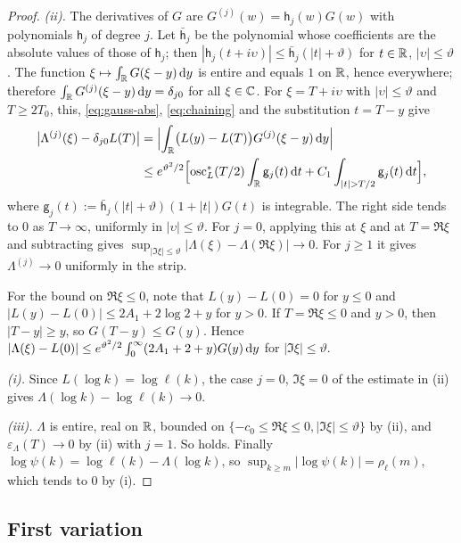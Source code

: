 \begin{proof}
\emph{(ii).} The derivatives of $G$ are $G^{(j)}(w)=\mathsf h_j(w)G(w)$ with polynomials $\mathsf h_j$ of degree $j$.
Let $\bar{\mathsf h}_j$ be the polynomial whose coefficients are the absolute values of those of $\mathsf h_j$; then
$|\mathsf h_j(t+i\upsilon)|\le\bar{\mathsf h}_j(|t|+\vartheta)$ for $t\in\mathbb{R}$, $|\upsilon|\le\vartheta$. The function
$\xi\mapsto\int_{\mathbb{R}} G(\xi-y)\,\mathrm{d} y$ is entire and equals $1$ on $\mathbb{R}$, hence everywhere; therefore
$\int_{\mathbb{R}} G^{(j)}(\xi-y)\,\mathrm{d} y=\delta_{j0}$ for all $\xi\in\mathbb{C}$. For $\xi=T+i\upsilon$ with $|\upsilon|\le\vartheta$ and
$T\ge2T_0$, this, \eqref{eq:gauss-abs}, \eqref{eq:chaining} and the substitution $t=T-y$ give
\begin{align*}
  \bigl|\Lambda^{(j)}(\xi)-\delta_{j0}L(T)\bigr|&=\Bigl|\int_\R\bigl(L(y)-L(T)\bigr)G^{(j)}(\xi-y)\diff y\Bigr|\\
  &\le e^{\vartheta^2/2}\Bigl[\osc_L^*(T/2)\int_\R \mathsf g_j(t)\diff t+C_1\int_{|t|>T/2}\mathsf g_j(t)\diff t\Bigr],
\end{align*}
where $\mathsf g_j(t):=\bar{\mathsf h}_j(|t|+\vartheta)(1+|t|)G(t)$ is integrable. The right side tends to $0$ as $T\to\infty$, uniformly in
$|\upsilon|\le\vartheta$. For $j=0$, applying this at $\xi$ and at $T=\Re\xi$ and subtracting gives
$\sup_{|\Im\xi|\le\vartheta}|\Lambda(\xi)-\Lambda(\Re\xi)|\to0$. For $j\ge1$ it gives $\Lambda^{(j)}\to0$ uniformly in the
strip.

For the bound on $\Re\xi\le0$, note that $L(y)-L(0)=0$ for $y\le0$ and $|L(y)-L(0)|\le2A_1+2\log2+y$ for $y>0$. If
$T=\Re\xi\le0$ and $y>0$, then $|T-y|\ge y$, so $G(T-y)\le G(y)$. Hence
$|\Lambda(\xi)-L(0)|\le e^{\vartheta^2/2}\int_0^\infty(2A_1+2+y)G(y)\,\mathrm{d} y$ for $|\Im\xi|\le\vartheta$.

\emph{(i).} Since $L(\log k)=\log\ell(k)$, the case $j=0$, $\Im\xi=0$ of the estimate in (ii) gives
$\Lambda(\log k)-\log\ell(k)\to0$.

\emph{(iii).} $\Lambda$ is entire, real on $\mathbb{R}$, bounded on $\{-c_0\le\Re\xi\le0,|\Im\xi|\le\vartheta\}$ by (ii), and
$\varepsilon_\Lambda(T)\to0$ by (ii) with $j=1$. So \Ath{\vartheta} holds. Finally
$\log\psi(k)=\log\ell(k)-\Lambda(\log k)$, so $\sup_{k\ge m}|\log\psi(k)|=\rho_\ell(m)$, which tends to $0$ by (i).
\end{proof}

\subsection{First variation}\label{sec:smoothing-fv}

